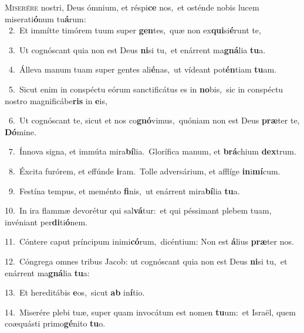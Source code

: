 \lettrine{\initial\textcolor{\initialcolor}{M}}{iserére} nostri, Deus ómnium, et réspi\textbf{ce} nos,~\star et osténde nobis lucem miserati\-\textbf{ó}\-num tu\-\textbf{á}\-rum:\\
{\numbfont\textcolor{\numbcolor}{~2.}}~Et immítte timórem tuum super \textbf{gen}\-tes,~\star quæ non ex\-\textbf{qui}\-si\-\textbf{é}\-runt te,\par
{\numbfont\textcolor{\numbcolor}{~3.}}~Ut cognóscant quia non est Deus \textbf{ni}\-si tu,~\star et enárrent ma\-\textbf{gná}\-lia \textbf{tu}\-a.\par
{\numbfont\textcolor{\numbcolor}{~4.}}~Álleva manum tuam super gentes ali\-\textbf{é}\-nas,~\star ut vídeant pot\-\textbf{én}\-tiam \textbf{tu}\-am.\par
{\numbfont\textcolor{\numbcolor}{~5.}}~Sicut enim in conspéctu eórum sanctificátus es in \textbf{no}\-bis,~\star sic in conspéctu nostro magnificábe\textbf{ris} in \textbf{e}\-is,\par
{\numbfont\textcolor{\numbcolor}{~6.}}~Ut cognóscant te, sicut et nos co\-\textbf{gnó}\-vimus,~\star quóniam non est Deus \textbf{præ}\-ter te, \textbf{Dó}\-mine.\par
{\numbfont\textcolor{\numbcolor}{~7.}}~Ínnova signa, et immúta mira\-\textbf{bí}\-lia.~\star Glorífica manum, et \textbf{brá}\-chium \textbf{dex}\-trum.\par
{\numbfont\textcolor{\numbcolor}{~8.}}~Éxcita furórem, et effúnde \textbf{i}\-ram.~\star Tolle adversárium, et afflíge \textbf{in}\-i\-\textbf{mí}\-cum.\par
{\numbfont\textcolor{\numbcolor}{~9.}}~Festína tempus, et meménto \textbf{fi}\-nis,~\star ut enárrent mira\-\textbf{bí}\-lia \textbf{tu}\-a.\par
{\numbfont\textcolor{\numbcolor}{10.}}~In ira flammæ devorétur qui sal\-\textbf{vá}\-tur:~\star et qui péssimant plebem tuam, invéniant per\-\textbf{di}\-ti\-\textbf{ó}\-nem.\par
{\numbfont\textcolor{\numbcolor}{11.}}~Cóntere caput príncipum inimi\-\textbf{có}\-rum,~\star dicéntium: Non est \textbf{á}\-lius \textbf{præ}\-ter nos.\par
{\numbfont\textcolor{\numbcolor}{12.}}~Cóngrega omnes tribus Jacob: ut cognóscant quia non est Deus \textbf{ni}\-si tu,~\star et enárrent ma\-\textbf{gná}\-lia \textbf{tu}\-a:\par
{\numbfont\textcolor{\numbcolor}{13.}}~Et hereditábis \textbf{e}\-os,~\star sicut \textbf{ab} in\-\textbf{í}\-tio.\par
{\numbfont\textcolor{\numbcolor}{14.}}~Miserére plebi tuæ, super quam invocátum est nomen \textbf{tu}\-um:~\star et Israël, quem coæquásti primo\-\textbf{gé}\-nito \textbf{tu}\-o.\par
